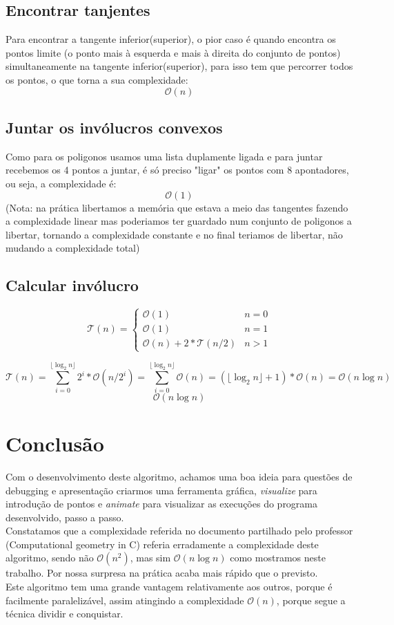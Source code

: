\documentclass[11pt]{article}
\begin{document}
\subsection{Encontrar tanjentes}
Para encontrar a tangente inferior(superior),
o pior caso é quando encontra os pontos limite
(o ponto mais à esquerda e mais à direita do conjunto de pontos) 
simultaneamente na tangente inferior(superior), 
para isso tem que percorrer todos os pontos,
o que torna a sua complexidade: 
$$\mathcal{O}(n)$$

\subsection{Juntar os invólucros convexos}
Como para os poligonos usamos uma lista duplamente ligada e
para juntar recebemos os 4 pontos a juntar, é só preciso 
"ligar" os pontos com 8 apontadores, ou seja, a complexidade é: 
$$\mathcal{O}(1)$$
(Nota: na prática libertamos a memória que estava 
a meio das tangentes fazendo a complexidade linear
mas poderiamos ter guardado num conjunto de poligonos 
a libertar, tornando a complexidade constante e no final 
teriamos de libertar, não mudando a complexidade total)

\subsection{Calcular invólucro}
$$
    \mathcal{T}(n) = 
        \begin{cases}
            \mathcal{O}(1)                      & n = 0\\
            \mathcal{O}(1)                      & n = 1\\
            \mathcal{O}(n) + 2*\mathcal{T}(n/2) & n > 1
        \end{cases}
$$

$$
    \mathcal{T}(n) = \sum_{i=0}^{\lfloor\log_{2}n\rfloor} 2^i*\mathcal{O}(n/2^i)
    = \sum_{i=0}^{\lfloor\log_{2}n\rfloor} \mathcal{O}(n)
    = (\lfloor\log_{2}n\rfloor + 1)*\mathcal{O}(n)
    = \mathcal{O}(n\log{n})
$$
$$
    \mathcal{O}(n\log{n})
$$


\section{Conclusão}
Com o desenvolvimento deste algoritmo, achamos uma boa ideia 
para questões de debugging e apresentação criarmos uma ferramenta
gráfica, \textit{visualize} para introdução de pontos e \textit{animate}
para visualizar as execuções do programa desenvolvido, passo a passo.\\
Constatamos que a complexidade referida no documento partilhado 
pelo professor (Computational geometry in C) referia erradamente 
a complexidade deste algoritmo, sendo não $\mathcal{O}(n^2)$, mas sim
$\mathcal{O}(n\log{n})$ como mostramos neste trabalho. Por nossa surpresa
na prática acaba mais rápido que o previsto.\\
Este algoritmo tem uma grande vantagem relativamente aos outros,
porque é facilmente paralelizável, assim atingindo a 
complexidade $\mathcal{O}(n)$, porque segue a técnica dividir e conquistar.
\end{document}
